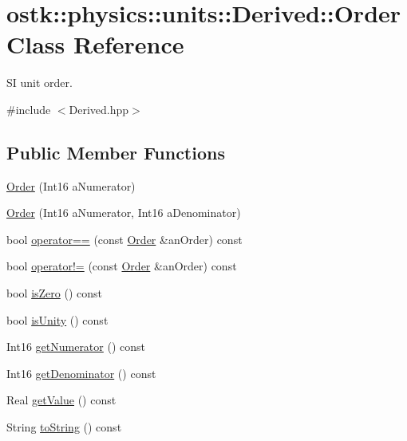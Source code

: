 \hypertarget{classostk_1_1physics_1_1units_1_1_derived_1_1_order}{}\section{ostk\+:\+:physics\+:\+:units\+:\+:Derived\+:\+:Order Class Reference}
\label{classostk_1_1physics_1_1units_1_1_derived_1_1_order}


SI unit order.  




{\ttfamily \#include $<$Derived.\+hpp$>$}

\subsection*{Public Member Functions}
\begin{DoxyCompactItemize}
\item 
\hyperlink{classostk_1_1physics_1_1units_1_1_derived_1_1_order_a6e4bb9bce71558c4b9be69f8a0ad1bae}{Order} (Int16 a\+Numerator)
\item 
\hyperlink{classostk_1_1physics_1_1units_1_1_derived_1_1_order_aaa8d9bb7e0a95ff4d2c6b5a7331950eb}{Order} (Int16 a\+Numerator, Int16 a\+Denominator)
\item 
bool \hyperlink{classostk_1_1physics_1_1units_1_1_derived_1_1_order_a4e31c5c43d72efcb4b1cdfdcbc78a5b7}{operator==} (const \hyperlink{classostk_1_1physics_1_1units_1_1_derived_1_1_order}{Order} \&an\+Order) const
\item 
bool \hyperlink{classostk_1_1physics_1_1units_1_1_derived_1_1_order_a2949ce7fa5cc33281fa83220795b4984}{operator!=} (const \hyperlink{classostk_1_1physics_1_1units_1_1_derived_1_1_order}{Order} \&an\+Order) const
\item 
bool \hyperlink{classostk_1_1physics_1_1units_1_1_derived_1_1_order_aa230971d521f6362aa8bcfc872c8e223}{is\+Zero} () const
\item 
bool \hyperlink{classostk_1_1physics_1_1units_1_1_derived_1_1_order_a03c2e7e7b304529322d14b8e212741a1}{is\+Unity} () const
\item 
Int16 \hyperlink{classostk_1_1physics_1_1units_1_1_derived_1_1_order_ad4f5eb34dac75f3b4698d5aea4efef13}{get\+Numerator} () const
\item 
Int16 \hyperlink{classostk_1_1physics_1_1units_1_1_derived_1_1_order_a2ebfa9e46f6287dd074e3f0fec204038}{get\+Denominator} () const
\item 
Real \hyperlink{classostk_1_1physics_1_1units_1_1_derived_1_1_order_ab0268c6dc35fc8defa43bc1ff0fa669c}{get\+Value} () const
\item 
String \hyperlink{classostk_1_1physics_1_1units_1_1_derived_1_1_order_a5483160d8589f945c569885c00e1fbbd}{to\+String} () const
\end{DoxyCompactItemize}
